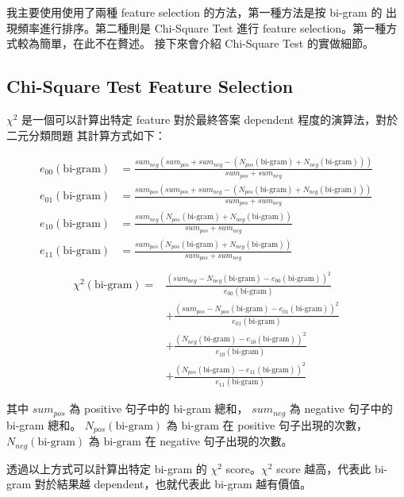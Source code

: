 \documentclass{article}[12pt]
\begin{document}
我主要使用使用了兩種 feature selection 的方法，第一種方法是按 bi-gram 的
出現頻率進行排序。第二種則是 Chi-Square Test 進行 feature selection。第一種方式較為簡單，在此不在贅述。
接下來會介紹 Chi-Square Test 的實做細節。

\subsection{Chi-Square Test Feature Selection}
$\chi^2$ 是一個可以計算出特定 feature 對於最終答案 dependent 程度的演算法，對於二元分類問題
其計算方式如下：

\begin{align*}
    e_{00}(\text{bi-gram}) &= \frac{sum_{neg}(sum_{pos}+sum_{neg}-(N_{pos}(\text{bi-gram})+N_{neg}(\text{bi-gram})))}{sum_{pos}+sum_{neg}} \\
    e_{01}(\text{bi-gram}) &= \frac{sum_{pos}(sum_{pos}+sum_{neg}-(N_{pos}(\text{bi-gram})+N_{neg}(\text{bi-gram})))}{sum_{pos}+sum_{neg}} \\
    e_{10}(\text{bi-gram}) &= \frac{sum_{neg}(N_{pos}(\text{bi-gram})+N_{neg}(\text{bi-gram}))}{sum_{pos}+sum_{neg}} \\
    e_{11}(\text{bi-gram}) &= \frac{sum_{pos}(N_{pos}(\text{bi-gram})+N_{neg}(\text{bi-gram}))}{sum_{pos}+sum_{neg}} \\
\end{align*}
\begin{equation}
    \begin{aligned}
        \chi^2(\text{bi-gram}) = &\frac{(sum_{neg} - N_{neg}(\text{bi-gram}) - e_{00}(\text{bi-gram}))^2}{e_{00}(\text{bi-gram})} \\
        &+ \frac{(sum_{pos} - N_{pos}(\text{bi-gram}) - e_{01}(\text{bi-gram}))^2}{e_{01}(\text{bi-gram})} \\
        &+ \frac{(N_{neg}(\text{bi-gram}) - e_{10}(\text{bi-gram}))^2}{e_{10}(\text{bi-gram})} \\
        &+ \frac{(N_{pos}(\text{bi-gram}) - e_{11}(\text{bi-gram}))^2}{e_{11}(\text{bi-gram})}
    \end{aligned}    
\end{equation}

其中 $sum_{pos}$ 為 positive 句子中的 bi-gram 總和，
$sum_{neg}$ 為 negative 句子中的 bi-gram 總和。
$N_{pos}(\text{bi-gram})$ 為 $\text{bi-gram}$ 在 positive 句子出現的次數，
$N_{neg}(\text{bi-gram})$ 為 $\text{bi-gram}$ 在 negative 句子出現的次數。

透過以上方式可以計算出特定 bi-gram 的 $\chi^2$ score。$\chi^2$ score 越高，代表此 bi-gram
對於結果越 dependent，也就代表此 bi-gram 越有價值。
\end{document}
